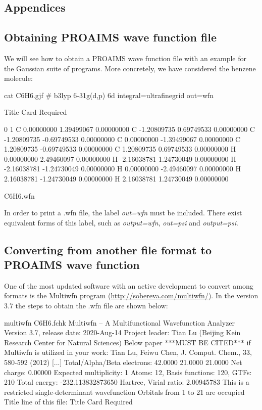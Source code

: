 \documentclass[a4paper,11pt,openany]{memoir}
\begin{document}
\begin{appendices}
\chapter{Appendices}
\section{Obtaining PROAIMS wave function file}\label{appx:getwfn}

We will see how to obtain a PROAIMS wave function file with an example for the Gaussian suite of programs. More concretely, we have considered the benzene molecule:
	\begin{consola}{cat C6H6.gjf}
# b3lyp 6-31g(d,p) 6d integral=ultrafinegrid
out=wfn

Title Card Required

0 1
C                  0.00000000    1.39499067    0.00000000
C                 -1.20809735    0.69749533    0.00000000
C                 -1.20809735   -0.69749533    0.00000000
C                  0.00000000   -1.39499067    0.00000000
C                  1.20809735   -0.69749533    0.00000000
C                  1.20809735    0.69749533    0.00000000
H                  0.00000000    2.49460097    0.00000000
H                 -2.16038781    1.24730049    0.00000000
H                 -2.16038781   -1.24730049    0.00000000
H                  0.00000000   -2.49460097    0.00000000
H                  2.16038781   -1.24730049    0.00000000
H                  2.16038781    1.24730049    0.00000000

C6H6.wfn
	\end{consola}

In order to print a .wfn file, the label \emph{out=wfn} must be included. There exist equivalent forms of this label, such as \emph{output=wfn}, \emph{out=psi} and \emph{output=psi}.

\section{Converting from another file format to PROAIMS wave function}\label{appx:convertwfn}
One of the most updated software with an active development to convert among formats is the Multiwfn program (\url{http://sobereva.com/multiwfn/}). In the version 3.7 the steps to obtain the .wfn file are shown below:
\begin{consola}{multiwfn C6H6.fchk}
Multiwfn -- A Multifunctional Wavefunction Analyzer
Version 3.7, release date: 2020-Aug-14
Project leader: Tian Lu (Beijing Kein Research Center for Natural Sciences)
Below paper ***MUST BE CITED*** if Multiwfn is utilized in your work:
Tian Lu, Feiwu Chen, J. Comput. Chem., 33, 580-592 (2012)
[...]
 Total/Alpha/Beta electrons:     42.0000     21.0000     21.0000
Net charge:     0.00000      Expected multiplicity:    1
Atoms:     12,  Basis functions:    120,  GTFs:    210
Total energy:    -232.113832873650 Hartree,   Virial ratio:  2.00945783
This is a restricted single-determinant wavefunction
Orbitals from 1 to    21 are occupied
Title line of this file: Title Card Required


\end{consola}
\end{appendices}
\end{document}
